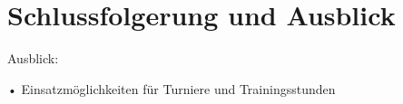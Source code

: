 \chapter{Schlussfolgerung und Ausblick}
\label{ch:zusammenfassung}


Ausblick:

•	Einsatzmöglichkeiten für Turniere und Trainingsstunden

